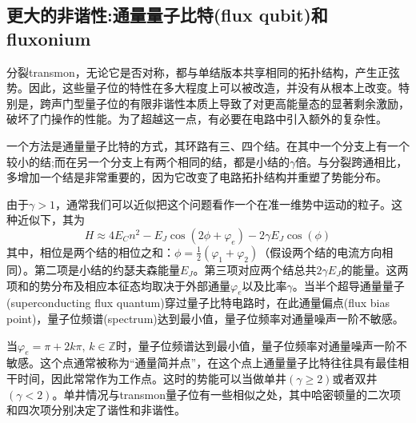 \documentclass[12pt, a4paper, oneside]{ctexbook}
\newcommand{\hl}[1]{\hlbox{#1}}
\newcounter{#2}
\newcounter{#2}[#1]
\numberwithin{#2}{#1}
\begin{document}
            \subsection{更大的非谐性:通量量子比特(flux qubit)和fluxonium}

            \begin{theorem}
              分裂transmon，无论它是否对称，都与单结版本共享相同的拓扑结构，产生正弦势。因此，这些量子位的特性在多大程度上可以被改造，并没有从根本上改变。特别是，跨声门型量子位的有限非谐性本质上导致了对更高能量态的显著剩余激励，破坏了门操作的性能。为了超越这一点，有必要在电路中引入额外的复杂性。
            \end{theorem}
            \begin{theorem}
              一个方法是通量量子比特的方式，其环路有三、四个结。在其中一个分支上有一个较小的结;而在另一个分支上有两个相同的结，都是小结的\(\gamma\)倍。与分裂跨通相比，多增加一个结是非常重要的，因为它改变了电路拓扑结构并重塑了势能分布。
            \end{theorem}
            \begin{theorem}
              由于\(\gamma>1\)，通常我们可以近似把这个问题看作一个在准一维势中运动的粒子。这种近似下，其\hl{哈密顿量}为
              \begin{equation}
                H \approx 4 E_C n^2-E_J \cos \left(2 \phi+\varphi_e\right)-2 \gamma E_J \cos (\phi)
              \end{equation}
              其中，相位是两个结的相位之和：\(\phi=\frac12(\varphi_1+\varphi_2)\)（假设两个结的电流方向相同）。第二项是小结的约瑟夫森能量\(E_J\)。第三项对应两个结总共\(2\gamma E_J\)的能量。这两项和的势分布及相应本征态均取决于外部通量\(\varphi_e\)以及比率\(\gamma\)。当半个超导通量量子(superconducting flux quantum)穿过量子比特电路时，在此通量偏点(flux bias point)，量子位频谱(spectrum)达到最小值，量子位频率对通量噪声一阶不敏感。
            \end{theorem}
            \begin{theorem}
              当\(\varphi_e=\pi+2k\pi,\,k\in\mathbb Z\)时，量子位频谱达到最小值，量子位频率对通量噪声一阶不敏感。这个点通常被称为“通量简并点”，在这个点上通量量子比特往往具有最佳相干时间，因此常常作为工作点。这时的势能可以当做单井\((\gamma\geq 2)\)或者双井\((\gamma<2)\)。单井情况与transmon量子位有一些相似之处，其中哈密顿量的二次项和四次项分别决定了谐性和非谐性。
            \end{theorem}
\end{document}
